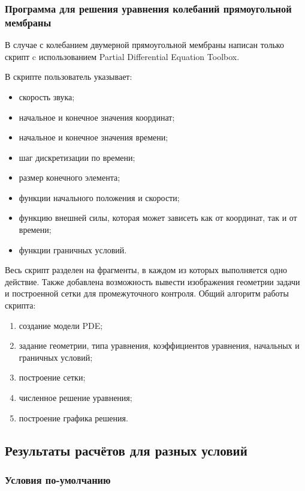 \documentclass[12pt,a4paper,russian]{report}
\begin{document}
	 \subsubsection{Программа для решения уравнения колебаний прямоугольной мембраны}
	
	В случае с колебанием двумерной прямоугольной мембраны написан только скрипт c использованием Partial Differential Equation Toolbox.
	
	В скрипте пользователь указывает:
	\begin{itemize}
		\item скорость звука;
		\item начальное и конечное значения координат;
		\item начальное и конечное значения времени;
		\item шаг дискретизации по времени;
		\item размер конечного элемента;
		\item функции начального положения и скорости;
		\item функцию внешней силы, которая может зависеть как от координат, так и от времени;
		\item функции граничных условий.
	\end{itemize}
	
	Весь скрипт разделен на фрагменты, в каждом из которых выполняется одно действие. Также добавлена возможность вывести изображения геометрии задачи и построенной сетки для промежуточного контроля.
	Общий алгоритм работы скрипта:
	
	\begin{enumerate}
		\item создание модели PDE;
		\item задание геометрии, типа уравнения, коэффициентов уравнения, начальных и граничных условий;
		\item построение сетки;
		\item численное решение уравнения;
		\item построение графика решения.
	\end{enumerate}
	
	\subsection{Результаты расчётов для разных условий}
	
	
	\subsubsection{Условия по-умолчанию}
	
\end{document}
